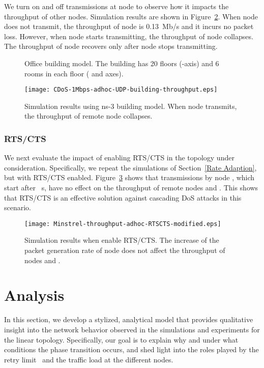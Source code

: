 \documentclass{IEEEtran}
\begin{document}
We turn on and off transmissions at node  to observe how it impacts the throughput of other nodes. Simulation results are shown in Figure~\ref{CDoS-1Mbps-adhoc-UDP-building-utilization}. When node  does not transmit, the throughput of node  is 0.13~Mb/s and it incurs no packet loss. However, when node  starts transmitting, the throughput of node  collapses. The throughput of node  recovers only after node  stops transmitting.


\begin{figure}[!t]
\centering
{}
\vfil
{}
\caption{Office building model. The building has 20 floors (-axis) and 6 rooms in each floor ( and  axes).}
\label{building_model}
\end{figure}

\begin{figure}[!t]
\centering
\texttt{[image: CDoS-1Mbps-adhoc-UDP-building-throughput.eps]}
\caption{Simulation results using ns-3 building model. When node  transmits, the throughput of remote node  collapses.}
\label{CDoS-1Mbps-adhoc-UDP-building-utilization}
\end{figure}



\subsubsection{RTS/CTS}
We next evaluate the impact of enabling RTS/CTS in the topology under consideration. Specifically, we repeat the simulations of Section~\ref{Rate Adaption}, but with RTS/CTS enabled. Figure~\ref{Simulation Result with RTSCTS} shows  that transmissions by node , which start after ~s, have no effect on the throughput of remote nodes  and . This shows that RTS/CTS is an effective solution against cascading DoS attacks in this scenario.

\begin{figure}[!t]
\centering
\texttt{[image: Minstrel-throughput-adhoc-RTSCTS-modified.eps]}
\caption{Simulation results when enable RTS/CTS. The increase of the packet generation rate of node  does not affect the throughput of nodes
 and .}
\label{Simulation Result with RTSCTS}
\end{figure}



\section{Analysis}
\label{Analysis}
In this section, we develop a stylized, analytical model that provides qualitative insight into the network behavior observed in the simulations and experiments for the
linear topology. Specifically, our goal is to explain why  and under what conditions the phase transition occurs, and shed light into the roles
played by the retry limit~ and the traffic load at the different nodes.
\end{document}

